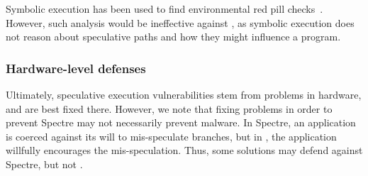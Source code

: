 Symbolic execution has been used to find
environmental red pill checks~\cite{schwartz2010all}. However, such analysis
would be ineffective against \speculake, as symbolic execution does not reason
about speculative paths and how they might influence a program.

%
%




\subsubsection{Hardware-level defenses}
Ultimately, speculative execution vulnerabilities stem from problems in
hardware, and are best fixed there. However, we note that fixing problems in
order to prevent Spectre may not necessarily prevent \speculake malware. In Spectre, an application is
coerced against its will to mis-speculate branches, but in \speculake, the
application willfully encourages the mis-speculation. Thus, some solutions may
defend against Spectre, but not \speculake.


